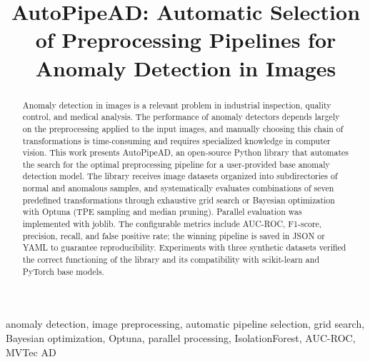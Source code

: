 \documentclass[conference]{IEEEtran}
\begin{document}
\title{AutoPipeAD: Automatic Selection of Preprocessing Pipelines
       for Anomaly Detection in Images}

\author{%
\and
{}
}

\maketitle

\begin{abstract}
Anomaly detection in images is a relevant problem in industrial inspection,
quality control, and medical analysis. The performance of anomaly detectors
depends largely on the preprocessing applied to the input images, and
manually choosing this chain of transformations is time-consuming and
requires specialized knowledge in computer vision. This work presents
AutoPipeAD, an open-source Python library that automates the search for the
optimal preprocessing pipeline for a user-provided base anomaly detection
model. The library receives image datasets organized into subdirectories of
normal and anomalous samples, and systematically evaluates combinations of
seven predefined transformations through exhaustive grid search or Bayesian
optimization with Optuna (TPE sampling and median pruning). Parallel
evaluation was implemented with joblib. The configurable metrics include
AUC-ROC, F1-score, precision, recall, and false positive rate; the winning
pipeline is saved in JSON or YAML to guarantee reproducibility. Experiments
with three synthetic datasets verified the correct functioning of the library
and its compatibility with scikit-learn and PyTorch base models.
\end{abstract}

\begin{IEEEkeywords}
anomaly detection, image preprocessing, automatic pipeline selection, grid
search, Bayesian optimization, Optuna, parallel processing, IsolationForest,
AUC-ROC, MVTec AD
\end{IEEEkeywords}
\end{document}

